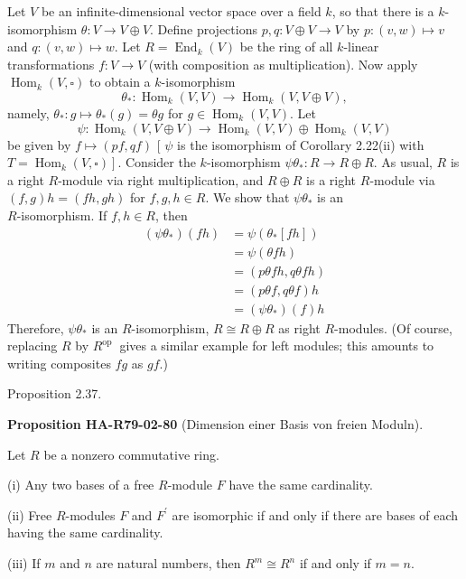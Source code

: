 \documentclass[10pt, letterpaper]{article}
\newcommand{\CustomHeading}[3]{%
  \par\medskip\noindent%
  \textbf{#1 #2} \textnormal{(#3)}.\enskip%
}
\newenvironment{PROP}[2]{\begin{unitbox}\CustomHeading{Proposition}{#1}{#2}}{\end{unitbox}}
\begin{document}
Let $V$ be an infinite-dimensional vector space over a field $k$, so that there is a $k$-isomorphism $\theta: V \rightarrow V \oplus V$. Define projections $p, q: V \oplus V \rightarrow V$ by $p:(v, w) \mapsto v$ and $q:(v, w) \mapsto w$. Let $R=\operatorname{End}_{k}(V)$ be the ring of all $k$-linear transformations $f: V \rightarrow V$ (with composition as multiplication). Now apply $\operatorname{Hom}_{k}(V, \square)$ to obtain a $k$-isomorphism
$$
\theta_{*}: \operatorname{Hom}_{k}(V, V) \rightarrow \operatorname{Hom}_{k}(V, V \oplus V),
$$
namely, $\theta_{*}: g \mapsto \theta_{*}(g)=\theta g$ for $g \in \operatorname{Hom}_{k}(V, V)$. Let
$$
\psi: \operatorname{Hom}_{k}(V, V \oplus V) \rightarrow \operatorname{Hom}_{k}(V, V) \oplus \operatorname{Hom}_{k}(V, V)
$$
be given by $f \mapsto(p f, q f)$ [ $\psi$ is the isomorphism of Corollary 2.22(ii) with $\left.T=\operatorname{Hom}_{k}(V, \square)\right]$. Consider the $k$-isomorphism $\psi \theta_{*}: R \rightarrow R \oplus R$. As usual, $R$ is a right $R$-module via right multiplication, and $R \oplus R$ is a right $R$-module via $(f, g) h=(f h, g h)$ for $f, g, h \in R$. We show that $\psi \theta_{*}$ is an\\
$R$-isomorphism. If $f, h \in R$, then
$$
\begin{aligned}
\left(\psi \theta_{*}\right)(f h) & =\psi\left(\theta_{*}[f h]\right) \\
& =\psi(\theta f h) \\
& =(p \theta f h, q \theta f h) \\
& =(p \theta f, q \theta f) h \\
& =\left(\psi \theta_{*}\right)(f) h
\end{aligned}
$$
Therefore, $\psi \theta_{*}$ is an $R$-isomorphism, $R \cong R \oplus R$ as right $R$-modules. (Of course, replacing $R$ by $R^{\text {op }}$ gives a similar example for left modules; this amounts to writing composites $f g$ as $g f$.)



Proposition 2.37. 

\begin{PROP}{HA-R79-02-80}{Dimension einer Basis von freien Moduln}
Let $R$ be a nonzero commutative ring.

(i) Any two bases of a free $R$-module $F$ have the same cardinality.

(ii) Free $R$-modules $F$ and $F^{\prime}$ are isomorphic if and only if there are bases of each having the same cardinality.

(iii) If $m$ and $n$ are natural numbers, then $R^{m} \cong R^{n}$ if and only if $m=n$.
\end{PROP}
\end{document}
